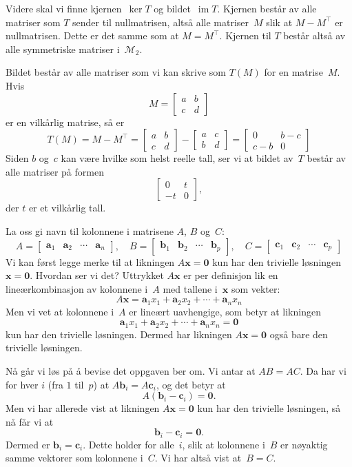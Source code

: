 \documentclass[notitlepage,a4paper,12pt,norsk]{IMFeksamen}
\newcommand{\M}{\mathcal{M}} %
\DeclareMathOperator{\im}{im}
\newcommand{\tr}{^\top}
\newcommand{\V}[1]{\mathbf{#1}}
\renewcommand{\a}{\V{a}}
\renewcommand{\b}{\V{b}}
\renewcommand{\c}{\V{c}}
\newcommand{\x}{\V{x}}
\newcommand{\0}{\V{0}}
\newcommand{\oppgslutt}{
\begin{center}
\pgfornament[width=6cm]{88}
\end{center}
}
\newenvironment{losning}{\begin{oppgave}}{\oppgslutt\end{oppgave}}
\begin{document}
\begin{losning}
Videre skal vi finne kjernen~$\ker T$ og bildet~$\im T$.
Kjernen består av alle matriser som $T$ sender til nullmatrisen,
altså alle matriser~$M$ slik at $M - M\tr$ er nullmatrisen.
Dette er det samme som at $M = M\tr$.
Kjernen til $T$ består altså av alle symmetriske matriser i~$\M_2$.

Bildet består av alle matriser som vi kan skrive som $T(M)$ for en matrise~$M$.
Hvis
\[
M =
\begin{bmatrix}
a & b \\
c & d
\end{bmatrix}
\]
er en vilkårlig matrise, så er
\[
T(M) = M - M\tr
=
\begin{bmatrix}
a & b \\
c & d
\end{bmatrix}
-
\begin{bmatrix}
a & c \\
b & d
\end{bmatrix}
=
\begin{bmatrix}
0   & b-c \\
c-b & 0
\end{bmatrix}
\]
Siden $b$ og~$c$ kan være hvilke som helst reelle tall,
ser vi at bildet av~$T$ består av alle matriser på formen
\[
\begin{bmatrix}
0  & t \\
-t & 0
\end{bmatrix},
\]
der $t$ er et vilkårlig tall.
\end{losning}


\begin{losning}
La oss gi navn til kolonnene i matrisene $A$, $B$ og~$C$:
\[
A = \begin{bmatrix} \a_1 & \a_2 & \cdots & \a_n \end{bmatrix}, \quad
B = \begin{bmatrix} \b_1 & \b_2 & \cdots & \b_p \end{bmatrix}, \quad
C = \begin{bmatrix} \c_1 & \c_2 & \cdots & \c_p \end{bmatrix}
\]
Vi kan først legge merke til at likningen $A \x = \0$
kun har den trivielle løsningen $\x = \0$.
Hvordan ser vi det?
Uttrykket $A \x$ er per definisjon lik en lineærkombinasjon av kolonnene i~$A$
med tallene i~$\x$ som vekter:
\[
A \x = \a_1 x_1 + \a_2 x_2 + \cdots + \a_n x_n
\]
Men vi vet at kolonnene i~$A$ er lineært uavhengige,
som betyr at likningen
\[
\a_1 x_1 + \a_2 x_2 + \cdots + \a_n x_n = \0
\]
kun har den trivielle løsningen.
Dermed har likningen $A \x = \0$ også bare den trivielle løsningen.

Nå går vi løs på å bevise det oppgaven ber om.
Vi antar at $AB = AC$.
Da har vi for hver $i$ (fra $1$ til~$p$) at
$A \b_i = A \c_i$,
og det betyr at
\[
A (\b_i - \c_i) = \0.
\]
Men vi har allerede vist at likningen $A \x = \0$
kun har den trivielle løsningen,
så nå får vi at
\[
\b_i - \c_i = \0.
\]
Dermed er $\b_i = \c_i$.
Dette holder for alle~$i$,
slik at kolonnene i~$B$ er nøyaktig samme vektorer som kolonnene i~$C$.
Vi har altså vist at~$B = C$.
\end{losning}
\end{document}
